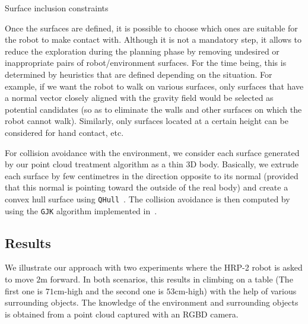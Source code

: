\begin{algorithm}
\caption{Surface inclusion constraints}
\label{alg:surf_inclusion}
\begin{algorithmic}
\EndFor{}
\EndFor{}
\end{algorithmic}
\end{algorithm}

Once the surfaces are defined, it is possible to choose which ones are suitable for the robot to make contact with.
Although it is not a mandatory step, it allows to reduce the exploration during the planning phase by removing undesired or inappropriate pairs of robot/environment surfaces.
For the time being, this is determined by heuristics that are defined depending on the situation.
For example, if we want the robot to walk on various surfaces, only surfaces that have a normal vector closely aligned with the gravity field would be selected as potential candidates (so as to eliminate the walls and other surfaces on which the robot cannot walk).
Similarly, only surfaces located at a certain height can be considered for hand contact, etc.

For collision avoidance with the environment, we consider each surface generated by our point cloud treatment algorithm as a thin 3D body.
Basically, we extrude each surface by few centimetres in the direction opposite to its normal (provided that this normal is pointing toward the outside of the real body) and create a convex hull surface using {\tt QHull}~\cite{qhull:acm:1996}.
The collision avoidance is then computed by using the {\tt GJK} algorithm implemented in~\cite{benallegue:icra:2009}.

\subsection{Results}
\label{sub:results_pcl_plannif}

We illustrate our approach with two experiments where the HRP-2 robot is asked to move $2$m forward.
In both scenarios, this results in climbing on a table (The first one is $71$cm-high and the second one is $53$cm-high) with the help of various surrounding objects.
The knowledge of the environment and surrounding objects is obtained from a point cloud captured with an RGBD camera.

